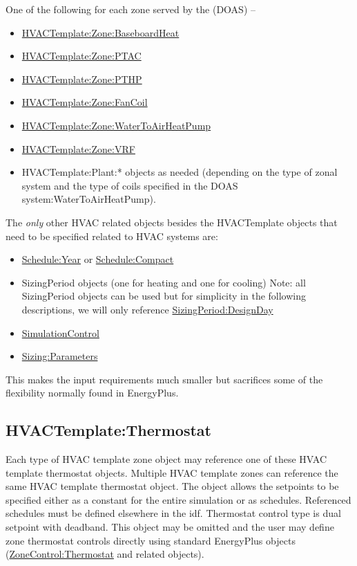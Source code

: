 One of the following for each zone served by the (DOAS) --

\begin{itemize}
\item
  \hyperref[hvactemplatezonebaseboardheat]{HVACTemplate:Zone:BaseboardHeat}
\item
  \hyperref[hvactemplatezoneptac]{HVACTemplate:Zone:PTAC}
\item
  \hyperref[hvactemplatezonepthp]{HVACTemplate:Zone:PTHP}
\item
  \hyperref[hvactemplatezonefancoil]{HVACTemplate:Zone:FanCoil}
\item
  \hyperref[hvactemplatezonewatertoairheatpump]{HVACTemplate:Zone:WaterToAirHeatPump}
\item
  \hyperref[hvactemplatezonevrf]{HVACTemplate:Zone:VRF}
\item
  HVACTemplate:Plant:* objects as needed (depending on the type of zonal system and the type of coils specified in the DOAS system:WaterToAirHeatPump).
\end{itemize}

The \emph{only} other HVAC related objects besides the HVACTemplate objects that need to be specified related to HVAC systems are:

\begin{itemize}
\item
  \hyperref[scheduleyear]{Schedule:Year} or \hyperref[schedulecompact]{Schedule:Compact}
\item
  SizingPeriod objects (one for heating and one for cooling) Note: all SizingPeriod objects can be used but for simplicity in the following descriptions, we will only reference \hyperref[sizingperioddesignday]{SizingPeriod:DesignDay}
\item
  \hyperref[simulationcontrol]{SimulationControl}
\item
  \hyperref[sizingparameters]{Sizing:Parameters}
\end{itemize}

This makes the input requirements much smaller but sacrifices some of the flexibility normally found in EnergyPlus.

\subsection{HVACTemplate:Thermostat}\label{hvactemplatethermostat}

Each type of HVAC template zone object may reference one of these HVAC template thermostat objects. Multiple HVAC template zones can reference the same HVAC template thermostat object. The object allows the setpoints to be specified either as a constant for the entire simulation or as schedules. Referenced schedules must be defined elsewhere in the idf. Thermostat control type is dual setpoint with deadband. This object may be omitted and the user may define zone thermostat controls directly using standard EnergyPlus objects (\hyperref[zonecontrolthermostat]{ZoneControl:Thermostat} and related objects).

